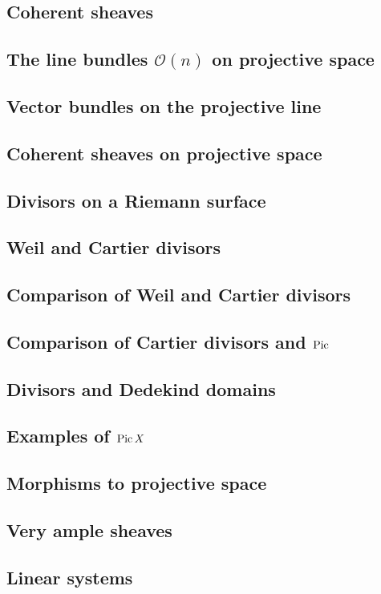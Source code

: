 \documentclass [11 pt, oneside, margin = 1 in] {article}
\begin{document}
\subsection{Coherent sheaves}
\subsection{The line bundles $\mathscr O(n)$ on projective space}
\subsection{Vector bundles on the projective line}
\subsection{Coherent sheaves on projective space}
\subsection{Divisors on a Riemann surface}
\subsection{Weil and Cartier divisors}
\subsection{Comparison of Weil and Cartier divisors}
\subsection{Comparison of Cartier divisors and $\operatorname{Pic}$}
\subsection{Divisors and Dedekind domains}
\subsection{Examples of $\operatorname{Pic} X$}
\subsection{Morphisms to projective space}
\subsection{Very ample sheaves}
\subsection{Linear systems}
\end{document}
